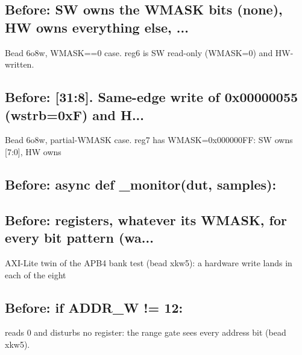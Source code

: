 \begin{record}
\subsection*{Before: SW owns the WMASK bits (none), HW owns everything else, ...}

\begin{textblock}
Bead 6o8w, WMASK==0 case.  reg6 is SW read-only (WMASK=0) and HW-written.
\end{textblock}

\subsection*{Before: [31:8].  Same-edge write of 0x00000055 (wstrb=0xF) and H...}

\begin{textblock}
Bead 6o8w, partial-WMASK case.  reg7 has WMASK=0x000000FF: SW owns [7:0], HW owns
\end{textblock}

\subsection*{Before: async def \_monitor(dut, samples):}


\subsection*{Before: registers, whatever its WMASK, for every bit pattern (wa...}

\begin{textblock}
AXI-Lite twin of the APB4 bank test (bead xkw5): a hardware write lands in each of the eight
\end{textblock}

\subsection*{Before: if ADDR\_W != 12:}

\begin{textblock}
reads 0 and disturbs no register: the range gate sees every address bit (bead xkw5).
\end{textblock}

\end{record}

